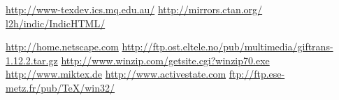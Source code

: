 \begin{htmlonly}
%
\internal{}%
%
%
%
%
%
%

\newcommand{\texdev}[1]{\htmladdnormallink
 {\texdevURL/#1}{\texdevURL/#1}}
\newcommand{\ctan}{http://ctan.tug.org/ctan}
\newcommand{\ctanTUG}{\htmladdnormallinkfoot
 {TUG's searchable CTAN site}{\ctan}}
\newcommand{\ctanURL}[1]{\htmladdnormallink
 {CTAN:\texttt{.../#1}}{\ctan/#1}}
\newcommand{\ctanURLbr}[1]{\htmladdnormallink
 {CTAN:\texttt{.../#1}}{\ctan/#1}}
\newcommand{\ctanTUGurl}[2]{\ctanURL{#2}}
\newcommand{\indichtml}{l2h/indic/IndicHTML/}

\end{htmlonly}

\newcommand{\TUGurl}{\htmladdnormallink{TUG}{\htmlurl{http://www.tug.org}}}

\newcommand{\texdevURL}{http://www-texdev.ics.mq.edu.au/}
\newcommand{\Unicode}{\htmladdnormallinkfoot
 {Unicode}{http://www.unicode.org/}}
\newcommand{\IndicHTML}{
 {Indic\TeX/HTML}}

\usepackage{array}

\newcommand{\Cs}[1]{{\upshape`\,\texttt{-#1}\,'}}
\newcommand{\Ve}[1]{\index{#1@\texttt{#1}}{\upshape`\,\texttt{#1}\,'}}
\newcommand{\Lc}[1]{{\upshape\ttfamily\char92#1}}
\newcommand{\Tc}[1]{{\upshape\ttfamily\char92#1}}

\newcommand{\ctanTUG}[1]{TUG's searchable CTAN site\footnote{\ctanTUGurl}}
\newcommand{\ctanURL}{CTAN: \penalty-200\ctanurl}
\newcommand{\ctanURLbr}{CTAN: \newline\ctanurl}
\urldef\texdev\url{http://www-texdev.ics.mq.edu.au/}
\urldef\ctanTUGurl\url{http://mirrors.ctan.org/}
\urldef\indichtml\url{l2h/indic/IndicHTML/}

\urldef\NetscapeHome\url{http://home.netscape.com}
\urldef\giftransURL\url{http://ftp.ost.eltele.no/pub/multimedia/giftrans-1.12.2.tar.gz}
\urldef\WinZipURL\url{http://www.winzip.com/getsite.cgi?winzip70.exe}
\urldef\MikTeXURL\url{http://www.miktex.de}
\urldef\ActiveStateURL\url{http://www.activestate.com}
\urldef\NetpbmWinURL\url{ftp://ftp.ese-metz.fr/pub/TeX/win32/}

\begin{htmlonly}
\newcommand{\NetscapeHome}{\url{http://home.netscape.com}}
\newcommand{\giftransURL}{\url{http://ftp.ost.eltele.no/pub/multimedia/giftrans-1.12.2.tar.gz}}
\newcommand{\WinZipURL}{\url{http://www.winzip.com/getsite.cgi?winzip70.exe}}
\newcommand{\MikTeXURL}{\url{http://www.miktex.de}}
\newcommand{\ActiveStateURL}{\url{http://www.activestate.com}}
\newcommand{\NetpbmWinURL}{\url{ftp://ftp.ese-metz.fr/pub/TeX/win32/}}
\end{htmlonly}



